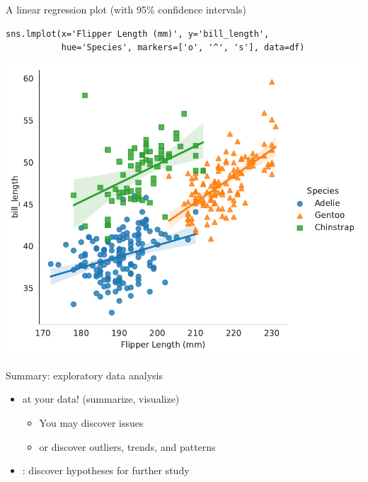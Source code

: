 \documentclass[aspectratio=169,usenames,dvipsnames]{beamer}
\begin{document}
\begin{frame}[fragile]{A linear regression plot (with 95\% confidence intervals)}
\vspace{-0.5em}
\begin{lstlisting}
sns.lmplot(x='Flipper Length (mm)', y='bill_length',
           hue='Species', markers=['o', '^', 's'], data=df)
\end{lstlisting}

\includegraphics[height=0.7\textheight]{fig/scatterpenguins2}
\end{frame}

\begin{frame}{Summary: exploratory data analysis}
    \begin{itemize}
        \item {} at your data! (summarize, visualize)
            \begin{itemize}
                \item You may discover issues
                \item or discover outliers, trends, and patterns
            \end{itemize}
        \item {}: discover hypotheses for further study
    \end{itemize}
\end{frame}

\end{document}
